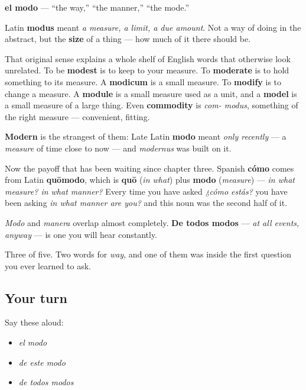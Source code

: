 \begin{cousinweb}
\textbf{el modo} — \textquotedblleft{}the way,\textquotedblright{} \textquotedblleft{}the manner,\textquotedblright{} \textquotedblleft{}the mode.\textquotedblright{}

Latin \textbf{modus} meant \emph{a measure, a limit, a due amount}. Not a way of doing in the abstract, but the \textbf{size} of a thing — how much of it there should be.

That original sense explains a whole shelf of English words that otherwise look unrelated. To be \textbf{modest} is to keep to your measure. To \textbf{moderate} is to hold something to its measure. A \textbf{modicum} is a small measure. To \textbf{modify} is to change a measure. A \textbf{module} is a small measure used as a unit, and a \textbf{model} is a small measure of a large thing. Even \textbf{commodity} is \emph{com- modus}, something of the right measure — convenient, fitting.

\textbf{Modern} is the strangest of them: Late Latin \textbf{modo} meant \emph{only recently} — a \emph{measure} of time close to now — and \emph{modernus} was built on it.

Now the payoff that has been waiting since chapter three. Spanish \textbf{cómo} comes from Latin \textbf{quōmodo}, which is \textbf{quō} (\emph{in what}) plus \textbf{modo} (\emph{measure}) — \emph{in what measure? in what manner?} Every time you have asked \emph{¿cómo estás?} you have been asking \emph{in what manner are you?} and this noun was the second half of it.

\emph{Modo} and \emph{manera} overlap almost completely. \textbf{De todos modos} — \emph{at all events, anyway} — is one you will hear constantly.
\end{cousinweb}

\begin{grammarlens}[title={What you've built}]
Three of five. Two words for \emph{way}, and one of them was inside the first question you ever learned to ask.
\end{grammarlens}

\subsection*{Your turn}
Say these aloud:

\begin{itemize}
\raggedright
  \item \emph{el modo}
  \item \emph{de este modo}
  \item \emph{de todos modos}
\end{itemize}

